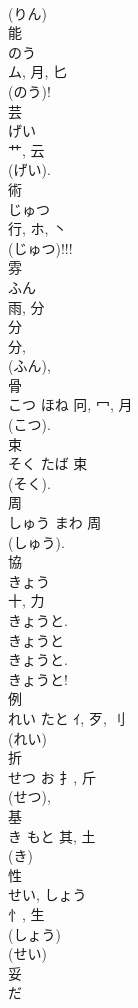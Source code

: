 \documentclass[8pt]{extreport}
\begin{document}
\begin{CJK}{UTF8}{min}
\\	(りん) 
\\	能	
\\	のう	
\\	ム, 月, 匕	
\\	(のう)! 
\\	芸	
\\	げい	
\\	艹, 云	
\\	(げい). 
\\	術	
\\	じゅつ	
\\	行, ホ, 丶	
\\	(じゅつ)!!!	
\\	雰	
\\	ふん	
\\	雨, 分	
\\	分
\\	分, 
\\	(ふん), 
\\	骨	
\\	こつ	ほね	冋, 冖, 月	
\\	(こつ). 
\\	束	
\\	そく	たば	束	
\\	(そく). 
\\	周	
\\	しゅう	まわ	周	
\\	(しゅう). 
\\	協	
\\	きょう	
\\	十, 力	
\\	きょうと. 
\\	きょうと 
\\	きょうと. 
\\	きょうと!	
\\	例	
\\	れい	たと	ｲ, 歹, 刂	
\\	(れい) 
\\	折	
\\	せつ	お	扌, 斤	
\\	(せつ), 
\\	基	
\\	き	もと	其, 土	
\\	(き) 
\\	性	
\\	せい, しょう	
\\	忄, 生	
\\	(しょう) 
\\	(せい) 
\\	妥	
\\	だ	

\end{CJK}
\end{document}
